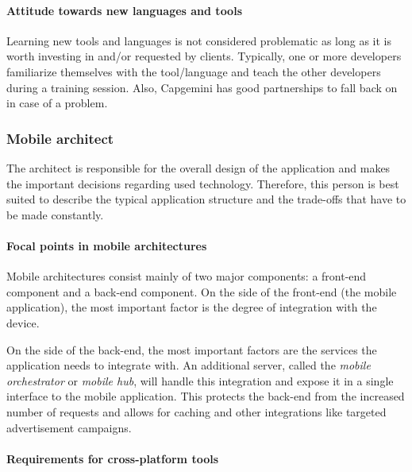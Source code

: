 \paragraph{Attitude towards new languages and tools} 

Learning new tools and languages is not considered problematic as long as it is worth investing in and/or requested by clients. Typically, one or more developers familiarize themselves with the tool/language and teach the other developers during a training session. Also, Capgemini has good partnerships to fall back on in case of a problem. 

\subsubsection{Mobile architect}

The architect is responsible for the overall design of the application and makes the important decisions regarding used technology. Therefore, this person is best suited to describe the typical application structure and the trade-offs that have to be made constantly.

\paragraph{Focal points in mobile architectures} 

Mobile architectures consist mainly of two major components: a front-end component and a back-end component. On the side of the front-end (the mobile application), the most important factor is the degree of integration with the device.

On the side of the back-end, the most important factors are the services the application needs to integrate with. An additional server, called the \emph{mobile orchestrator} or \emph{mobile hub}, will handle this integration and expose it in a single interface to the mobile application. This protects the back-end from the increased number of requests and allows for caching and other integrations like targeted advertisement campaigns.

\paragraph{Requirements for cross-platform tools}

